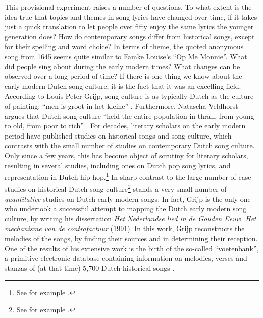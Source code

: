 This provisional experiment raises a number of questions. To what extent is the idea true that topics and themes in song lyrics have changed over time, if it takes just a quick translation to let people over fifty enjoy the same lyrics the younger generation does? How do contemporary songs differ from historical songs, except for their spelling and word choice? In terms of theme, the quoted anonymous song from 1645 seems quite similar to Famke Louise's \enquote{Op Me Monnie}. What did people sing about during the early modern times? What changes can be observed over a long period of time? If there is one thing we know about the early modern Dutch song culture, it is the fact that it was an excelling field. According to Louis Peter Grijp, song culture is as typically Dutch as the culture of painting: \enquote{men is groot in het kleine} \autocite[29]{grijp_het_1991}. Furthermore, Natascha Veldhorst argues that Dutch song culture \enquote{held the entire population in thrall, from young to old, from poor to rich} \autocite[217]{veldhorst_pharmacy_2008}. For decades, literary scholars on the early modern period have published studies on historical songs and song culture, which contrasts with the small number of studies on contemporary Dutch song culture. Only since a few years, this has become object of scrutiny for literary scholars, resulting in several studies, including ones on Dutch pop song lyrics, and representation in Dutch hip hop.\footnote{See for example \autocites{buelens_listen_2013}{roest_buurtvaders._2017}.} In sharp contrast to the large number of case studies on historical Dutch song culture\footnote{See for example \autocites{stronks_dees_2014}{stronks_stichten_1996-1}.} stands a very small number of \textit{quantitative} studies on Dutch early modern songs. In fact, Grijp is the only one who undertook a successful attempt to mapping the Dutch early modern song culture, by writing his dissertation \textit{Het Nederlandse lied in de Gouden Eeuw. Het mechanisme van de contrafactuur} (1991). In this work, Grijp reconstructs the melodies of the songs, by finding their sources and in determining their reception. One of the results of his extensive work is the birth of the so-called \enquote{voetenbank}, a primitive electronic database containing information on melodies, verses and stanzas of (at that time) 5,700 Dutch historical songs \autocite[13]{grijp_het_1991}.

